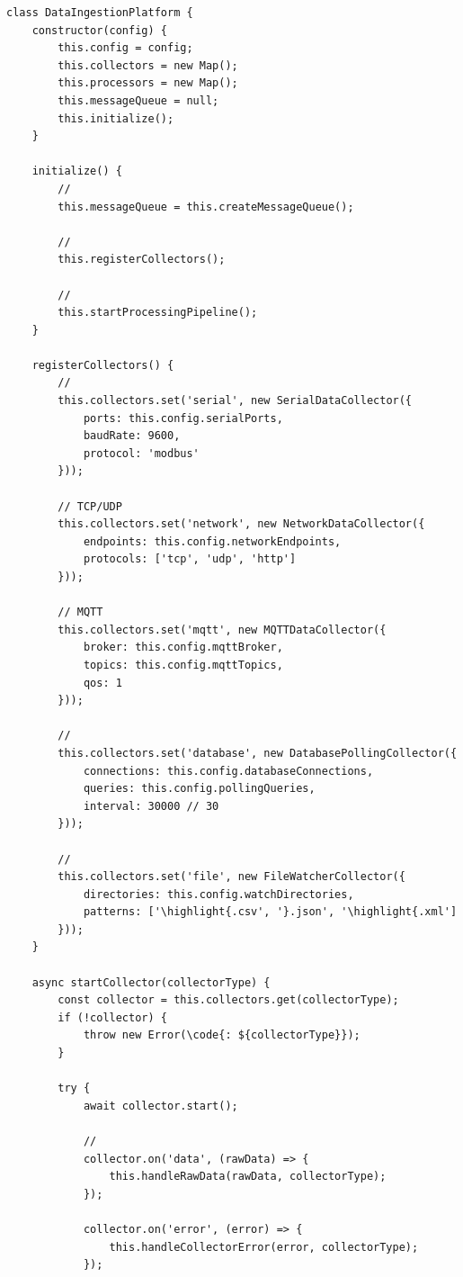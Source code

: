 \begin{lstlisting}[style=javascript]
class DataIngestionPlatform {
    constructor(config) {
        this.config = config;
        this.collectors = new Map();
        this.processors = new Map();
        this.messageQueue = null;
        this.initialize();
    }
    
    initialize() {
        // 
        this.messageQueue = this.createMessageQueue();
        
        // 
        this.registerCollectors();
        
        // 
        this.startProcessingPipeline();
    }
    
    registerCollectors() {
        // 
        this.collectors.set('serial', new SerialDataCollector({
            ports: this.config.serialPorts,
            baudRate: 9600,
            protocol: 'modbus'
        }));
        
        // TCP/UDP
        this.collectors.set('network', new NetworkDataCollector({
            endpoints: this.config.networkEndpoints,
            protocols: ['tcp', 'udp', 'http']
        }));
        
        // MQTT
        this.collectors.set('mqtt', new MQTTDataCollector({
            broker: this.config.mqttBroker,
            topics: this.config.mqttTopics,
            qos: 1
        }));
        
        // 
        this.collectors.set('database', new DatabasePollingCollector({
            connections: this.config.databaseConnections,
            queries: this.config.pollingQueries,
            interval: 30000 // 30
        }));
        
        // 
        this.collectors.set('file', new FileWatcherCollector({
            directories: this.config.watchDirectories,
            patterns: ['\highlight{.csv', '}.json', '\highlight{.xml']
        }));
    }
    
    async startCollector(collectorType) {
        const collector = this.collectors.get(collectorType);
        if (!collector) {
            throw new Error(\code{: ${collectorType}});
        }
        
        try {
            await collector.start();
            
            // 
            collector.on('data', (rawData) => {
                this.handleRawData(rawData, collectorType);
            });
            
            collector.on('error', (error) => {
                this.handleCollectorError(error, collectorType);
            });
            

\end{lstlisting}
